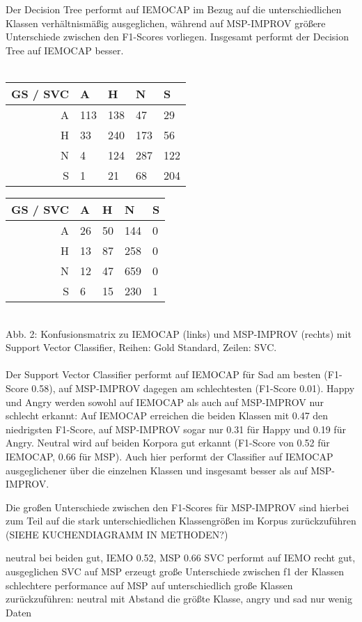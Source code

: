 \documentclass{article} %
\begin{document}
Der Decision Tree performt auf IEMOCAP im Bezug auf die unterschiedlichen Klassen verhältnismäßig ausgeglichen, während auf MSP-IMPROV größere Unterschiede zwischen den F1-Scores vorliegen. Insgesamt performt der Decision Tree auf IEMOCAP besser. \\ \\
\begin{tabular}{|r|llll|}
\hline
GS / SVC & A & H & N & S \\
\hline
A & 113 & 138 & 47 & 29 \\
H & 33 & 240 & 173 & 56 \\
N & 4 & 124 & 287 & 122 \\
S & 1 & 21 & 68 & 204 \\
\hline
\end{tabular} 
\begin{tabular}{|r|llll|}
\hline
GS / SVC & A & H & N & S \\
\hline
A & 26 & 50 & 144 & 0 \\
H & 13 & 87 & 258 & 0 \\
N & 12 & 47 & 659 & 0 \\
S & 6 & 15 & 230 & 1 \\
\hline
\end{tabular} \\

Abb. 2: Konfusionsmatrix zu IEMOCAP (links) und MSP-IMPROV (rechts) mit Support Vector Classifier, Reihen: Gold Standard, Zeilen: SVC. \\
\\

Der Support Vector Classifier performt auf IEMOCAP für Sad am besten (F1-Score 0.58), auf MSP-IMPROV dagegen am schlechtesten (F1-Score 0.01). Happy und Angry werden sowohl auf IEMOCAP als auch auf MSP-IMPROV nur schlecht erkannt: Auf IEMOCAP erreichen die beiden Klassen mit 0.47 den niedrigsten F1-Score, auf MSP-IMPROV sogar nur 0.31 für Happy und 0.19 für Angry. 
Neutral wird auf beiden Korpora gut erkannt (F1-Score von 0.52 für IEMOCAP, 0.66 für MSP). Auch hier performt der Classifier auf IEMOCAP ausgeglichener über die einzelnen Klassen und insgesamt besser als auf MSP-IMPROV. 

Die großen Unterschiede zwischen den F1-Scores für MSP-IMPROV sind hierbei zum Teil auf die stark unterschiedlichen Klassengrößen im Korpus zurückzuführen (SIEHE KUCHENDIAGRAMM IN METHODEN?)

neutral bei beiden gut, IEMO 0.52, MSP 0.66
SVC performt auf IEMO recht gut, ausgeglichen
SVC auf MSP erzeugt große Unterschiede zwischen f1 der Klassen
schlechtere performance auf MSP auf unterschiedlich große Klassen zurückzuführen: neutral mit Abstand die größte Klasse, angry und sad nur wenig Daten
\end{document}
